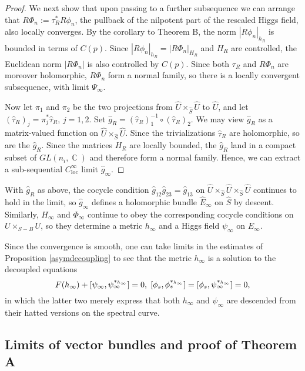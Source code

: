 \documentclass[10pt]{amsart}
\theoremstyle{definition}
\DeclareMathOperator{\C}{\mathbb{C}}
\begin{document}
\begin{proof}
We next show that upon passing to a further subsequence we can arrange that $R\Phi_n := \tau_R^*R\phi_n$, the pullback of the nilpotent part of the rescaled Higgs field, also locally converges. By the corollary to Theorem B, the norm $|R\phi_n|_{h_R}$ is bounded in terms of $C(p)$. Since $|R\phi_n|_{h_R} = |R\Phi_n|_{H_R}$ and $H_R$ are controlled, the Euclidean norm $|R\Phi_n|$ is also controlled by $C(p)$. Since both $\tau_R$ and $R\Phi_n$ are moreover holomorphic, $R\Phi_n$ form a normal family, so there is a locally convergent subsequence, with limit $\Psi_\infty$.

Now let $\pi_1$ and $\pi_2$ be the two projections from $\hat{U} \times_{\hat{S}} \hat{U}$ to $\hat{U}$, and let $(\hat{\tau}_R)_j = \pi_j^* \hat{\tau}_R$, $j=1,2$. Set $\hat{g}_R = (\hat{\tau}_R)_1^{-1} \circ (\hat{\tau}_R)_2$. We may view $\hat{g}_R$ as a matrix-valued function on $\hat{U} \times_{\hat{S}} \hat{U}$. Since the trivializations $\hat{\tau}_R$ are holomorphic, so are the $\hat{g}_R$. Since the matrices $H_R$ are locally bounded, the $\hat{g}_R$ land in a compact subset of $GL({n_i}, \C)$ and therefore form a normal family. Hence, we can extract a sub-sequential $C^{\infty}_{\mathrm{loc}}$ limit $\hat{g}_\infty$.

\end{proof}

With $\hat{g}_R$ as above, the cocycle condition $\hat{g}_{12}\hat{g}_{23} = \hat{g}_{13}$ on $\hat{U} \times_{\hat{S}} \hat{U} \times_{\hat{S}} \hat{U}$ continues to hold in the limit, so $\hat{g}_\infty$ defines a holomorphic bundle $\hat{E}_\infty$ on $\hat{S}$ by descent. Similarly, $H_\infty$ and $\Phi_\infty$ continue to obey the corresponding cocycle conditions on $U \times_{S-B} U$, so they determine a metric $h_\infty$ and a Higgs field $\psi_\infty$ on $E_\infty$. 

Since the convergence is smooth, one can take limits in the estimates of Proposition \ref{asymdecoupling} to see that the metric $h_\infty$ is a solution to the decoupled equations
$$F(h_\infty) + [\psi_\infty,\psi_\infty^{*_{h_\infty}}]=0, \hspace{1mm} [\phi_s,\phi_s^{*_{h_{\infty}}}] =[\phi_s,\psi_\infty^{*_{h_\infty}}]=0,$$
in which the latter two merely express that both $h_\infty$ and $\psi_\infty$ are descended from their hatted versions on the spectral curve.

\subsection{Limits of vector bundles and proof of Theorem A}
\end{document}
